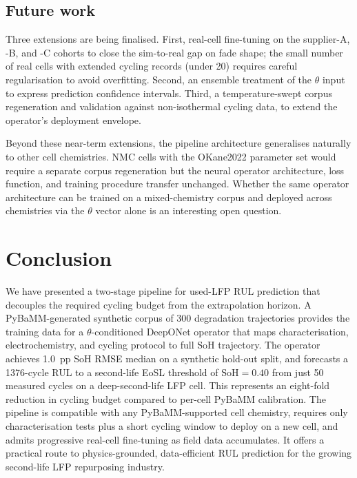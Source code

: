 \documentclass[preprint,12pt,3p,authoryear]{elsarticle}
\begin{document}
\subsection{Future work}

Three extensions are being finalised. First, real-cell fine-tuning on
the supplier-A, -B, and -C cohorts to close the sim-to-real gap on fade
shape; the small number of real cells with extended cycling records
(under \num{20}) requires careful regularisation to avoid overfitting.
Second, an ensemble treatment of the \(\theta\) input to express
prediction confidence intervals. Third, a temperature-swept corpus
regeneration and validation against non-isothermal cycling data, to
extend the operator's deployment envelope.

Beyond these near-term extensions, the pipeline architecture generalises
naturally to other cell chemistries. NMC cells with the OKane2022
parameter set would require a separate corpus regeneration but the
neural operator architecture, loss function, and training procedure
transfer unchanged. Whether the same operator architecture can be
trained on a mixed-chemistry corpus and deployed across chemistries via
the \(\theta\) vector alone is an interesting open question.

\section{Conclusion}
\label{sec:conclusion}

We have presented a two-stage pipeline for used-LFP RUL prediction that
decouples the required cycling budget from the extrapolation horizon. A
PyBaMM-generated synthetic corpus of \num{300} degradation trajectories
provides the training data for a \(\theta\)-conditioned DeepONet
operator that maps characterisation, electrochemistry, and cycling
protocol to full SoH trajectory. The operator achieves \SI{1.0}{pp} SoH
RMSE median on a synthetic hold-out split, and forecasts a
\num{1376}-cycle RUL to a second-life EoSL threshold of \(\text{SoH} =
0.40\) from just \num{50} measured cycles on a deep-second-life LFP
cell. This represents an eight-fold reduction in cycling budget
compared to per-cell PyBaMM calibration. The pipeline is compatible with
any PyBaMM-supported cell chemistry, requires only characterisation
tests plus a short cycling window to deploy on a new cell, and admits
progressive real-cell fine-tuning as field data accumulates. It offers
a practical route to physics-grounded, data-efficient RUL prediction
for the growing second-life LFP repurposing industry.
\end{document}
